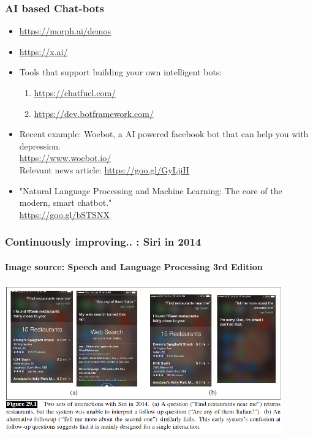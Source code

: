 \documentclass{beamer}
\begin{document}
\begin{frame}
\frametitle{AI based Chat-bots}
\begin{itemize}
\item \url{https://morph.ai/demos}
\item \url{https://x.ai/}
\item Tools that support building your own intelligent bots:
\begin{enumerate}
\item \url{https://chatfuel.com/}
\item \url{https://dev.botframework.com/}
\end{enumerate}
\item Recent example: Woebot, a AI powered facebook bot that can help you with depression. 
\\ \url{https://www.woebot.io/}
\\ Relevant news article: \url{https://goo.gl/GyLjiH} \pause
\item "Natural Language Processing and Machine Learning: The core of the modern, smart chatbot."
\\ \url{https://goo.gl/bSTSNX}
\end{itemize}
\end{frame}

\begin{frame}
\frametitle{Continuously improving.. : Siri in 2014}
\framesubtitle{Image source: Speech and Language Processing 3rd Edition}
\includegraphics[width=0.9\textwidth]{siri2014.png}
\end{frame}
\end{document}
